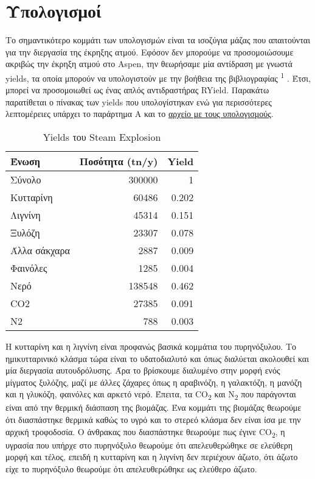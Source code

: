 \documentclass[11pt]{article}
\makeatletter
\newcommand{\citeprocitem}[2]{\hyper@linkstart{cite}{citeproc_bib_item_#1}#2\hyper@linkend}
\makeatother
\begin{document}
\section{Υπολογισμοί}
\label{sec:org3a00366}
Το σημαντικότερο κομμάτι των υπολογισμών είναι τα ισοζύγια μάζας που απαιτούνται για την διεργασία της έκρηξης ατμού. Εφόσον δεν μπορούμε να προσομοιώσουμε ακριβώς την έκρηξη ατμού στο Aspen, την θεωρήσαμε μία αντίδραση με γνωστά yields, τα οποία μπορούν να υπολογιστούν με την βοήθεια της βιβλιογραφίας \textsuperscript{\citeprocitem{1}{1}} . Έτσι, μπορεί να προσομοιωθεί ως ένας απλός αντιδραστήρας RYield. Παρακάτω παρατίθεται ο πίνακας των yields που υπολογίστηκαν ενώ για περισσότερες λεπτομέρειες υπάρχει το παράρτημα Α και το \href{https://github.com/Vidianos-Giannitsis/Process-Design/blob/master/Calculations/mass\_balances.ods}{αρχείο με τους υπολογισμούς}.

\begin{table}[htbp]
\caption{Yields του Steam Explosion}
\centering
\begin{tabular}{lrr}
Ένωση & Ποσότητα (tn/y) & Yield\\
\hline
Σύνολο & 300000 & 1\\
Κυτταρίνη & 60486 & 0.202\\
Λιγνίνη & 45314 & 0.151\\
Ξυλόζη & 23307 & 0.078\\
Άλλα σάκχαρα & 2887 & 0.009\\
Φαινόλες & 1285 & 0.004\\
Νερό & 138548 & 0.462\\
CO2 & 27385 & 0.091\\
N2 & 788 & 0.003\\
\end{tabular}
\end{table}

Η κυτταρίνη και η λιγνίνη είναι προφανώς βασικά κομμάτια του πυρηνόξυλου. Το ημικυτταρινικό κλάσμα τώρα είναι το υδατοδιαλυτό και όπως διαλύεται ακολουθεί και μία διεργασία αυτουδρόλυσης. Άρα το βρίσκουμε διαλυμένο στην μορφή ενός μίγματος ξυλόζης, μαζί με άλλες ζάχαρες όπως η αραβινόζη, η γαλακτόζη, η μανόζη και η γλυκόζη, φαινόλες και αρκετό νερό. Έπειτα, τα CO\textsubscript{2} και N\textsubscript{2} που παράγονται είναι από την θερμική διάσπαση της βιομάζας. Ένα κομμάτι της βιομάζας θεωρούμε ότι διασπάστηκε θερμικά καθώς το υγρό και το στερεό κλάσμα δεν είναι ίσα με την αρχική τροφοδοσία. Ο άνθρακας που διασπάστηκε θεωρούμε πως έγινε CO\textsubscript{2}, η υγρασία που υπήρχε στο πυρηνόξυλο θεωρούμε ότι απελευθερώθηκε σε ελεύθερη μορφή και τέλος, επειδή η κυτταρίνη και η λιγνίνη δεν περιέχουν άζωτο, ότι άζωτο είχε το πυρηνόξυλο θεωρούμε ότι απελευθερώθηκε ως ελεύθερο άζωτο.
\end{document}
